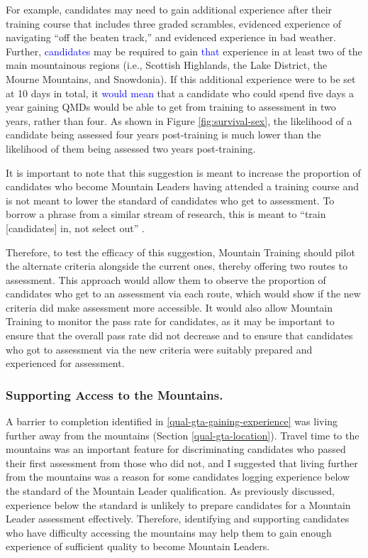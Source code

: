 \documentclass[
  12pt,
  a4paper,
]{book}
\begin{document}
For example, candidates may need to gain additional experience after their training course that includes three graded scrambles, evidenced experience of navigating ``off the beaten track,'' and evidenced experience in bad weather. Further, \textcolor{blue}{candidates} may be required to gain \textcolor{blue}{that} experience in at least two of the main mountainous regions (i.e., Scottish Highlands, the Lake District, the Mourne Mountains, and Snowdonia). If this additional experience were to be set at 10 days in total, it \textcolor{blue}{would mean} that a candidate who could spend five days a year gaining QMDs would be able to get from training to assessment in two years, rather than four. As shown in Figure \ref{fig:survival-sex}, the likelihood of a candidate being assessed four years post-training is much lower than the likelihood of them being assessed two years post-training.

It is important to note that this suggestion is meant to increase the proportion of candidates who become Mountain Leaders having attended a training course and is not meant to lower the standard of candidates who get to assessment. To borrow a phrase from a similar stream of research, this is meant to ``train {[}candidates{]} in, not select out'' \citep{Hardy2014d}.

Therefore, to test the efficacy of this suggestion, Mountain Training should pilot the alternate criteria alongside the current ones, thereby offering two routes to assessment. This approach would allow them to observe the proportion of candidates who get to an assessment via each route, which would show if the new criteria did make assessment more accessible. It would also allow Mountain Training to monitor the pass rate for candidates, as it may be important to ensure that the overall pass rate did not decrease and to ensure that candidates who got to assessment via the new criteria were suitably prepared and experienced for assessment.

\hypertarget{supporting-access-to-the-mountains.}{%
\subsubsection{Supporting Access to the Mountains.}\label{supporting-access-to-the-mountains.}}

A barrier to completion identified in \ref{qual-gta-gaining-experience} was living further away from the mountains (Section \ref{qual-gta-location}). Travel time to the mountains was an important feature for discriminating candidates who passed their first assessment from those who did not, and I suggested that living further from the mountains was a reason for some candidates logging experience below the standard of the Mountain Leader qualification. As previously discussed, experience below the standard is unlikely to prepare candidates for a Mountain Leader assessment effectively. Therefore, identifying and supporting candidates who have difficulty accessing the mountains may help them to gain enough experience of sufficient quality to become Mountain Leaders.
\end{document}
